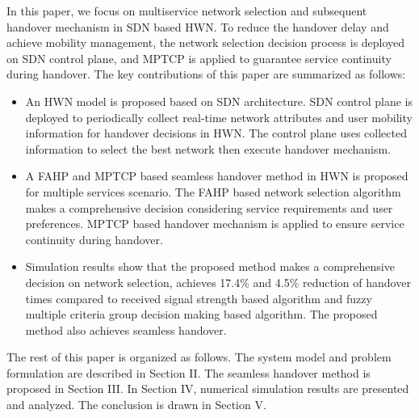 \documentclass[conference]{IEEEtran}
\begin{document}
In this paper, we focus on multiservice network selection and subsequent handover mechanism in SDN based HWN.
To reduce the handover delay and achieve mobility management, the network selection decision process is deployed on SDN control plane, and MPTCP is applied to guarantee service continuity during handover.
The key contributions of this paper are summarized as follows: 
\begin{itemize}
	\item 
	An HWN model is proposed based on SDN architecture. 
	SDN control plane is deployed to periodically collect real-time network attributes and user mobility information for handover decisions in HWN. The control plane uses collected information to select the best network then execute handover mechanism. 
	\item A FAHP and MPTCP based seamless handover method in HWN is proposed for multiple services scenario. 
	The FAHP based network selection algorithm makes a comprehensive decision considering service requirements and user preferences.
	MPTCP based handover mechanism is applied to ensure service continuity during handover.
	\item Simulation results show that the proposed method makes a comprehensive decision on network selection, achieves  17.4\% and 4.5\% reduction of handover times compared to received signal strength based algorithm and fuzzy multiple criteria group decision making based algorithm.
	The proposed method also achieves seamless handover.
	

\end{itemize}
  

The rest of this paper is organized as follows. 
The system model and problem formulation are described in Section II. 
The seamless handover method is proposed in Section III.
In Section IV, numerical simulation results are presented and analyzed.
The conclusion is drawn in Section V.
\end{document}
